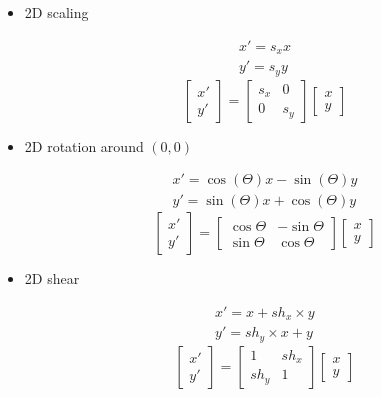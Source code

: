 \documentclass{article}
\begin{document}
\begin{itemize}
  \item 2D scaling

        \begin{align*}
          x' = s_{x}x \\
          y' = s_{y}y
        \end{align*}
\[
  \begin{bmatrix}
    x'\\ y'
  \end{bmatrix} =
  \begin{bmatrix}
    s_{x} & 0 \\
    0 & s_{y}
  \end{bmatrix}\begin{bmatrix}
    x \\ y
  \end{bmatrix}
        \]
  \item 2D rotation around $(0,0)$

        \begin{align*}
          x' = \cos(\Theta)x - \sin(\Theta)y \\
          y' = \sin(\Theta)x + \cos(\Theta)y
        \end{align*}
\[
  \begin{bmatrix}
    x'\\ y'
  \end{bmatrix} =
  \begin{bmatrix}
    \cos\Theta & -\sin\Theta \\
    \sin\Theta & \cos\Theta
  \end{bmatrix}\begin{bmatrix}
    x \\ y
  \end{bmatrix}
        \]
  \item 2D shear

        \begin{align*}
          x' = x + sh_{x} \times y\\
          y' = sh_{y} \times x + y
        \end{align*}
\[
  \begin{bmatrix}
    x'\\ y'
  \end{bmatrix} =
  \begin{bmatrix}
    1 & sh_{x} \\
    sh_{y} & 1
  \end{bmatrix}\begin{bmatrix}
    x \\ y
  \end{bmatrix}
        \]


\end{itemize}
\end{document}
